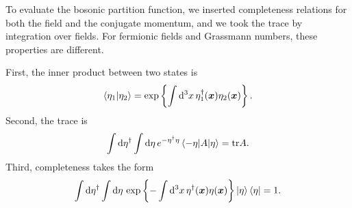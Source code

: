 To evaluate the bosonic partition function, we inserted completeness relations for both the field and the conjugate momentum, and we took the trace by integration over fields.
For fermionic fields and Grassmann numbers, these properties are different.

First, the inner product between two states is
\begin{equation}
	\braket{\eta_1 | \eta_2} = \exp \left\{ \int \mathop{}\!\mathrm{d}^3 x \, \eta_1^\dagger({\bm{x}}) \eta_2({\bm{x}}) \right\} .
\label{eq:tft:grassmann_inner_product}
\end{equation}
Second, the trace is 
\begin{equation}
	\int \mathop{}\!\mathrm{d} \eta^\dagger \int \mathop{}\!\mathrm{d} \eta \, e^{-\eta^\dagger \eta} \braket{-\eta | A | \eta} = \text{tr} A .
\label{eq:tft:trace_grassmann}
\end{equation}
Third, completeness takes the form
\begin{equation}
	\int \mathop{}\!\mathrm{d} \eta^\dagger \int \mathop{}\!\mathrm{d} \eta \, \exp \left\{-\int \mathop{}\!\mathrm{d}^3 x \, \eta^\dagger({\bm{x}}) \eta({\bm{x}}) \right\} \ket{\eta} \bra{\eta} = 1 .
\label{eq:tft:completeness_grassmann}
\end{equation}


